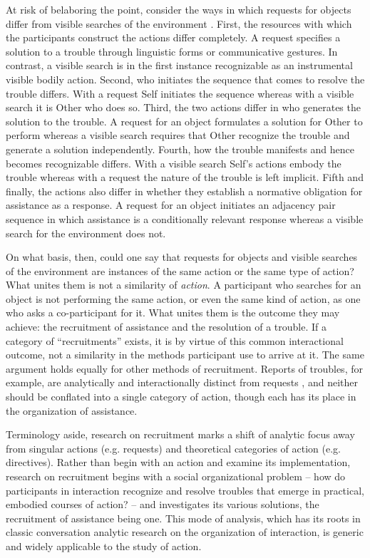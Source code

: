 \documentclass[output=paper,nonflat,modfont,draft]{langsci/langscibook}
\begin{document}
At risk of belaboring the point, consider the ways in which requests for objects differ from visible searches of the environment \citep[cf.][10--11]{KendrickDrew2016}. First, the resources with which the participants construct the actions differ completely. A request specifies a solution to a trouble through linguistic forms or communicative gestures. In contrast, a visible search is in the first instance recognizable as an instrumental visible bodily action. Second, who initiates the sequence that comes to resolve the trouble differs. With a request Self initiates the sequence whereas with a visible search it is Other who does so. Third, the two actions differ in who generates the solution to the trouble. A request for an object formulates a solution for Other to perform whereas a visible search requires that Other recognize the trouble and generate a solution independently. Fourth, how the trouble manifests and hence becomes recognizable differs. With a visible search Self’s actions embody the trouble whereas with a request the nature of the trouble is left implicit. Fifth and finally, the actions also differ in whether they establish a normative obligation for assistance as a response. A request for an object initiates an adjacency pair sequence in which assistance is a conditionally relevant response whereas a visible search for the environment does not.

\hspace*{-.5mm}On what basis, then, could one say that requests for objects and visible searches of the environment are instances of the same action or the same type of action? What unites them is not a similarity of \textit{action}. A participant who searches for an object is not performing the same action, or even the same kind of action, as one who asks a co-participant for it. What unites them is the outcome they may achieve: the recruitment of assistance and the resolution of a trouble. If a category of “recruitments” exists, it is by virtue of this common interactional outcome, not a similarity in the methods participant use to arrive at it. The same argument holds equally for other methods of recruitment. Reports of troubles, for example, are analytically and interactionally distinct from requests \citep{KendrickDrew2016}, and neither should be conflated into a single category of action, though each has its place in the organization of assistance.

Terminology aside, research on recruitment marks a shift of analytic focus away from singular actions (e.g. requests) and theoretical categories of action (e.g. directives). Rather than begin with an action and examine its implementation, research on recruitment begins with a social organizational problem -- how do participants in interaction recognize and resolve troubles that emerge in practical, embodied courses of action? -- and investigates its various solutions, the recruitment of assistance being one. This mode of analysis, which has its roots in classic conversation analytic research on the organization of interaction, is generic and widely applicable to the study of action.
\end{document}
